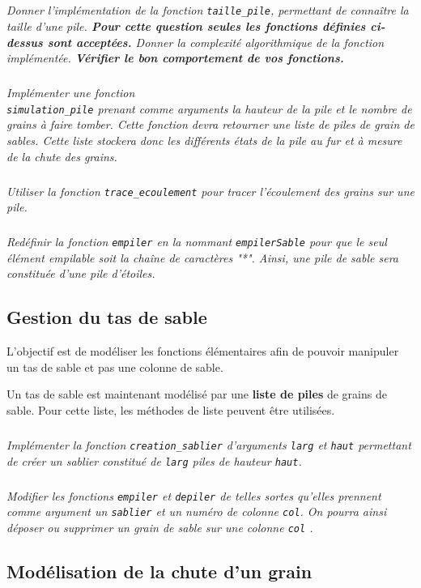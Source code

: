 \subparagraph{}
\textit{Donner l'implémentation de la fonction \texttt{taille\_pile}, permettant de connaître la taille d'une pile. \textbf{Pour cette question seules les fonctions définies ci-dessus sont acceptées.} Donner la complexité algorithmique de la fonction implémentée. \textbf{Vérifier le bon comportement de vos fonctions.}}

\subparagraph{}
\textit{Implémenter une fonction \\ \texttt{simulation\_pile} prenant comme arguments la hauteur de la pile et le nombre de grains à faire tomber. Cette fonction devra retourner une liste de piles de grain de sables. Cette liste stockera donc les différents états de la pile au fur et à mesure de la chute des grains.}


\subparagraph{}
\textit{Utiliser la fonction  \texttt{trace\_ecoulement} pour tracer l'écoulement des grains sur une pile.}




\subparagraph{}
\textit{Redéfinir la fonction \texttt{empiler} en la nommant \texttt{empilerSable} pour que le seul élément empilable soit la chaîne de caractères "*". Ainsi, une pile de sable sera constituée d'une pile d'étoiles. }

\subsection*{Gestion du tas de sable}
\begin{obj}
L'objectif est de modéliser les fonctions élémentaires afin de pouvoir manipuler un tas de sable et pas une colonne de sable.
\end{obj}

Un tas de sable est maintenant modélisé par une \textbf{liste de piles} de grains de sable. Pour cette liste, les méthodes de liste peuvent être utilisées.

\subparagraph{}\textit{Implémenter la fonction \texttt{creation\_sablier} d'arguments \texttt{larg} et \texttt{haut} permettant de créer un sablier constitué de \texttt{larg} piles de hauteur \texttt{haut}.}


\subparagraph{}\textit{Modifier les fonctions \texttt{empiler} et \texttt{depiler} de telles sortes qu'elles prennent comme argument un \texttt{sablier} et un numéro de colonne \texttt{col}. On pourra ainsi déposer ou supprimer un grain de sable sur une colonne \texttt{col} .}

\subsection*{Modélisation de la chute d'un grain}

